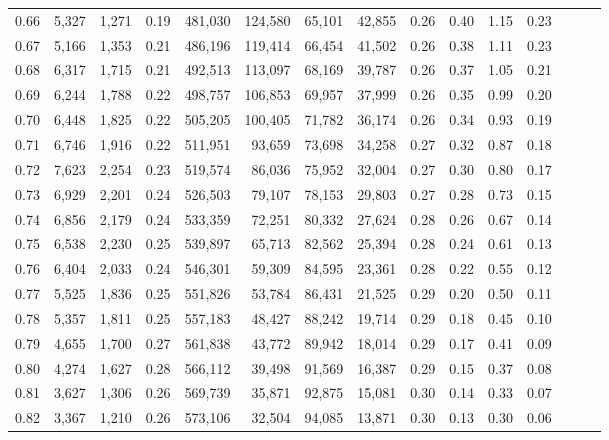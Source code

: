 \begin{tabular}{rrrrrrrrrrrrrrr}
0.66 &   5,327 &  1,271 &  0.19 &  481,030 &  124,580 &   65,101 &   42,855 &  0.26 &  0.40 &  1.15 &      0.23 \\
0.67 &   5,166 &  1,353 &  0.21 &  486,196 &  119,414 &   66,454 &   41,502 &  0.26 &  0.38 &  1.11 &      0.23 \\
0.68 &   6,317 &  1,715 &  0.21 &  492,513 &  113,097 &   68,169 &   39,787 &  0.26 &  0.37 &  1.05 &      0.21 \\
0.69 &   6,244 &  1,788 &  0.22 &  498,757 &  106,853 &   69,957 &   37,999 &  0.26 &  0.35 &  0.99 &      0.20 \\
0.70 &   6,448 &  1,825 &  0.22 &  505,205 &  100,405 &   71,782 &   36,174 &  0.26 &  0.34 &  0.93 &      0.19 \\
0.71 &   6,746 &  1,916 &  0.22 &  511,951 &   93,659 &   73,698 &   34,258 &  0.27 &  0.32 &  0.87 &      0.18 \\
0.72 &   7,623 &  2,254 &  0.23 &  519,574 &   86,036 &   75,952 &   32,004 &  0.27 &  0.30 &  0.80 &      0.17 \\
0.73 &   6,929 &  2,201 &  0.24 &  526,503 &   79,107 &   78,153 &   29,803 &  0.27 &  0.28 &  0.73 &      0.15 \\
0.74 &   6,856 &  2,179 &  0.24 &  533,359 &   72,251 &   80,332 &   27,624 &  0.28 &  0.26 &  0.67 &      0.14 \\
0.75 &   6,538 &  2,230 &  0.25 &  539,897 &   65,713 &   82,562 &   25,394 &  0.28 &  0.24 &  0.61 &      0.13 \\
0.76 &   6,404 &  2,033 &  0.24 &  546,301 &   59,309 &   84,595 &   23,361 &  0.28 &  0.22 &  0.55 &      0.12 \\
0.77 &   5,525 &  1,836 &  0.25 &  551,826 &   53,784 &   86,431 &   21,525 &  0.29 &  0.20 &  0.50 &      0.11 \\
0.78 &   5,357 &  1,811 &  0.25 &  557,183 &   48,427 &   88,242 &   19,714 &  0.29 &  0.18 &  0.45 &      0.10 \\
0.79 &   4,655 &  1,700 &  0.27 &  561,838 &   43,772 &   89,942 &   18,014 &  0.29 &  0.17 &  0.41 &      0.09 \\
0.80 &   4,274 &  1,627 &  0.28 &  566,112 &   39,498 &   91,569 &   16,387 &  0.29 &  0.15 &  0.37 &      0.08 \\
0.81 &   3,627 &  1,306 &  0.26 &  569,739 &   35,871 &   92,875 &   15,081 &  0.30 &  0.14 &  0.33 &      0.07 \\
0.82 &   3,367 &  1,210 &  0.26 &  573,106 &   32,504 &   94,085 &   13,871 &  0.30 &  0.13 &  0.30 &      0.06 \\

\end{tabular}
